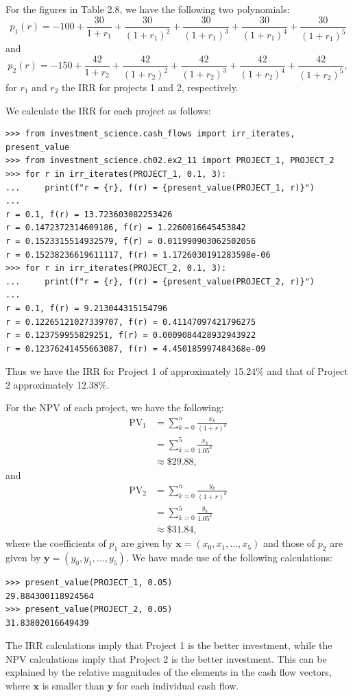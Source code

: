 For the figures in Table 2.8, we have the following two polynomials:
\[
    p_1(r) = -100 + \frac{30}{1 + r_1} + \frac{30}{{(1 + r_1)}^2}
    + \frac{30}{{(1 + r_1)}^3} + \frac{30}{{(1 + r_1)}^4}
    + \frac{30}{{(1 + r_1)}^5}
\]
and
\[
    p_2(r) = -150 + \frac{42}{1 + r_2} + \frac{42}{{(1 + r_2)}^2}
    + \frac{42}{{(1 + r_2)}^3} + \frac{42}{{(1 + r_2)}^4}
    + \frac{42}{{(1 + r_2)}^5},
\]
for $r_1$ and $r_2$ the IRR for projects 1 and 2, respectively.

We calculate the IRR for each project as follows:
\begin{lstlisting}
>>> from investment_science.cash_flows import irr_iterates, present_value
>>> from investment_science.ch02.ex2_11 import PROJECT_1, PROJECT_2
>>> for r in irr_iterates(PROJECT_1, 0.1, 3):
...     print(f"r = {r}, f(r) = {present_value(PROJECT_1, r)}")
...
r = 0.1, f(r) = 13.723603082253426
r = 0.1472372314609186, f(r) = 1.2260016645453842
r = 0.1523315514932579, f(r) = 0.011990903062502056
r = 0.15238236619611117, f(r) = 1.1726030191283598e-06
>>> for r in irr_iterates(PROJECT_2, 0.1, 3):
...     print(f"r = {r}, f(r) = {present_value(PROJECT_2, r)}")
...
r = 0.1, f(r) = 9.213044315154796
r = 0.12265121027339707, f(r) = 0.41147097421796275
r = 0.123759955829251, f(r) = 0.0009084428932943922
r = 0.12376241455663087, f(r) = 4.450185997484368e-09
\end{lstlisting}
Thus we have the IRR for Project 1 of approximately 15.24\% and that of
Project 2 approximately 12.38\%.

For the NPV of each project, we have the following:
\begin{equation*}
    \begin{split}
        \text{PV}_1 &= \sum_{k = 0}^n{\frac{x_k}{{(1 + r)}^k}} \\
        &= \sum_{k = 0}^5{\frac{x_k}{1.05^k}} \\
        &\approx \$29.88,
    \end{split}
\end{equation*}
and
\begin{equation*}
    \begin{split}
        \text{PV}_2 &= \sum_{k = 0}^n{\frac{y_k}{{(1 + r)}^k}} \\
        &= \sum_{k = 0}^5{\frac{y_k}{1.05^k}} \\
        &\approx \$31.84,
    \end{split}
\end{equation*}
where the coefficients of $p_1$ are given by
$\mathbf{x} = (x_0, x_1, \ldots, x_5)$ and those of $p_2$ are given by
$\mathbf{y} = (y_0, y_1, \ldots, y_5)$. We have made use of the following
calculations:
\begin{lstlisting}
>>> present_value(PROJECT_1, 0.05)
29.884300118924564
>>> present_value(PROJECT_2, 0.05)
31.83802016649439
\end{lstlisting}

The IRR calculations imply that Project 1 is the better investment, while the
NPV calculations imply that Project 2 is the better investment. This can be
explained by the relative magnitudes of the elements in the cash flow
vectors, where $\mathbf{x}$ is smaller than $\mathbf{y}$ for each individual
cash flow.
